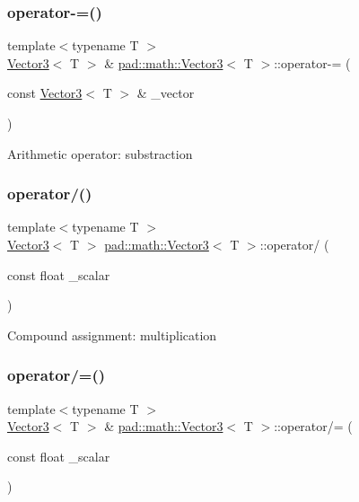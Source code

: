 \subsubsection{\texorpdfstring{operator-\/=()}{operator-=()}}
{\footnotesize\ttfamily template$<$typename T $>$ \\
\mbox{\hyperlink{structpad_1_1math_1_1_vector3}{Vector3}}$<$ T $>$ \& \mbox{\hyperlink{structpad_1_1math_1_1_vector3}{pad\+::math\+::\+Vector3}}$<$ T $>$\+::operator-\/= (\begin{DoxyParamCaption}\item[{const \mbox{\hyperlink{structpad_1_1math_1_1_vector3}{Vector3}}$<$ T $>$ \&}]{\+\_\+vector }\end{DoxyParamCaption})}

Arithmetic operator\+: substraction \mbox{\label{structpad_1_1math_1_1_vector3_a6da03717416e8f24f15c69a195e89734}} 
\subsubsection{\texorpdfstring{operator/()}{operator/()}}
{\footnotesize\ttfamily template$<$typename T $>$ \\
\mbox{\hyperlink{structpad_1_1math_1_1_vector3}{Vector3}}$<$ T $>$ \mbox{\hyperlink{structpad_1_1math_1_1_vector3}{pad\+::math\+::\+Vector3}}$<$ T $>$\+::operator/ (\begin{DoxyParamCaption}\item[{const float}]{\+\_\+scalar }\end{DoxyParamCaption})}

Compound assignment\+: multiplication \mbox{\label{structpad_1_1math_1_1_vector3_a562f20bc51eb5d598acecf4233bb8005}} 
\subsubsection{\texorpdfstring{operator/=()}{operator/=()}}
{\footnotesize\ttfamily template$<$typename T $>$ \\
\mbox{\hyperlink{structpad_1_1math_1_1_vector3}{Vector3}}$<$ T $>$ \& \mbox{\hyperlink{structpad_1_1math_1_1_vector3}{pad\+::math\+::\+Vector3}}$<$ T $>$\+::operator/= (\begin{DoxyParamCaption}\item[{const float}]{\+\_\+scalar }\end{DoxyParamCaption})}

